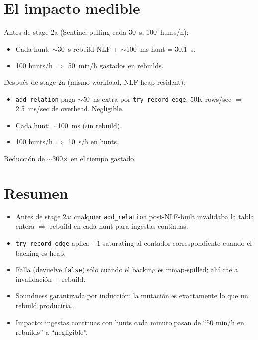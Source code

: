 \section{El impacto medible}

Antes de stage 2a (Sentinel pulling cada 30~s, 100~hunts/h):

\begin{itemize}
    \item Cada hunt: $\sim$30~s rebuild NLF + $\sim$100~ms hunt =
    30.1~s.
    \item 100 hunts/h $\Rightarrow$ 50~min/h gastados en rebuilds.
\end{itemize}

\noindent
Después de stage 2a (mismo workload, NLF heap-resident):

\begin{itemize}
    \item \texttt{add\_relation} paga $\sim$50~ns extra por
    \texttt{try\_record\_edge}. 50K rows/sec $\Rightarrow$ 2.5~ms/sec
    de overhead. Negligible.
    \item Cada hunt: $\sim$100~ms (sin rebuild).
    \item 100 hunts/h $\Rightarrow$ 10~s/h en hunts.
\end{itemize}

\noindent
Reducción de $\sim$300\(\times\) en el tiempo gastado.

\section{Resumen}

\begin{itemize}
    \item Antes de stage 2a: cualquier \texttt{add\_relation}
    post-NLF-built invalidaba la tabla entera $\Rightarrow$ rebuild
    en cada hunt para ingestas continuas.
    \item \texttt{try\_record\_edge} aplica $+1$ saturating al
    contador correspondiente cuando el backing es heap.
    \item Falla (devuelve \texttt{false}) sólo cuando el backing
    es mmap-spilled; ahí cae a invalidación + rebuild.
    \item Soundness garantizada por inducción: la mutación es
    exactamente lo que un rebuild produciría.
    \item Impacto: ingestas continuas con hunts cada minuto pasan de
    ``50 min/h en rebuilds'' a ``negligible''.
\end{itemize}


